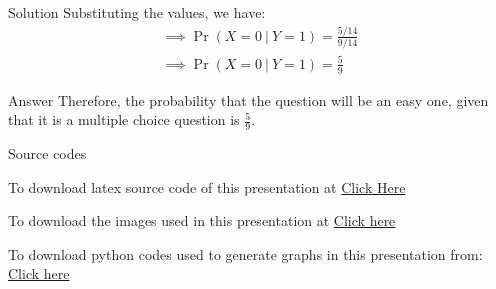 \documentclass{beamer}
\providecommand{\pr}[1]{\ensuremath{\Pr\left(#1\right)}}
\numberwithin{equation}{subsection}
\begin{document}
\begin{frame}{Solution}
    Substituting the values, we have:
\begin{align}
    \implies \pr{X = 0\ |\ Y = 1} = \frac{5/14}{9/14}\\
    \implies \pr{X = 0\ |\ Y = 1} = \frac{5}{9}
\end{align}

\begin{block}{Answer}
    Therefore, the probability that the question will be an easy one, given that it is a multiple choice question is $\displaystyle\frac{5}{9}$.
\end{block}

\end{frame}

\begin{frame}{Source codes}
    \begin{block}{To download latex source code of this presentation at}
        \href{https://github.com/TushitaSharva/PRV_2022/blob/main/ASSIGNMENT_4/latex source codes/LatexBeamer_Assign4.tex}{Click Here}
    \end{block}
    
    \begin{block}{To download the images used in this presentation at}
        \href{https://github.com/TushitaSharva/PRV_2022/tree/main/ASSIGNMENT_4/Images}{Click here}
    \end{block}
    
    \begin{block}{To download python codes used to generate graphs in this presentation from:}
        \href{https://github.com/TushitaSharva/PRV_2022/tree/main/ASSIGNMENT_4/python codes}{Click here}
    \end{block}
    
\end{frame}
\end{document}
